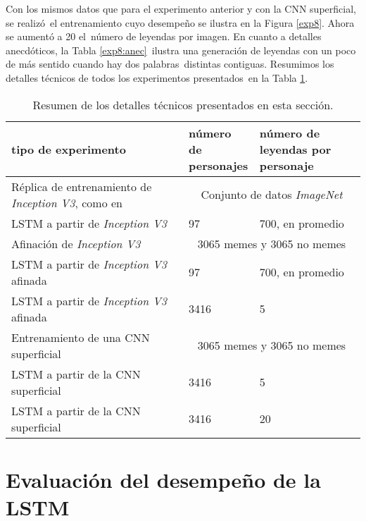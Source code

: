 Con los mismos datos que para el experimento anterior y con la CNN superficial, se realizó\
el entrenamiento cuyo desempeño se ilustra en la Figura \ref{exp8}. Ahora se aumentó a 20 el\
número de leyendas por imagen. En cuanto a detalles anecdóticos, la Tabla \ref{exp8:anec}\
ilustra una generación de leyendas con un poco de más sentido cuando hay dos palabras\
distintas contiguas. Resumimos los detalles técnicos de todos los experimentos presentados\
en la Tabla \ref{exp-details}.

\begin{table}[H]
  \begin{tabular}{|p{0.5\linewidth}|p{0.2\linewidth}|p{0.3\linewidth}|}
    \hline
    \textbf{tipo de experimento} & \textbf{número de personajes} & \textbf{número de leyendas por personaje}\\
    \hline \hline
    Réplica de entrenamiento de \emph{Inception V3}, como en \cite{DBLP:journals/corr/VinyalsTBE16} & \multicolumn{2}{|c|}{Conjunto de datos \emph{ImageNet}} \\
    \hline
    LSTM a partir de \emph{Inception V3} & 97 & 700, en promedio \\
    \hline
    Afinación de \emph{Inception V3} & \multicolumn{2}{|c|}{3065 memes y 3065 no memes} \\
    \hline
    LSTM a partir de \emph{Inception V3} afinada & 97 & 700, en promedio \\
    \hline
    LSTM a partir de \emph{Inception V3} afinada & 3416 & 5 \\
    \hline
    Entrenamiento de una CNN superficial & \multicolumn{2}{|c|}{3065 memes y 3065 no memes} \\
    \hline
    LSTM a partir de la CNN superficial & 3416 & 5 \\
    \hline
    LSTM a partir de la CNN superficial & 3416 & 20 \\
    \hline
  \end{tabular}
  \caption{
    Resumen de los detalles técnicos presentados en esta sección.
  }
  \label{exp-details}
\end{table}

\section{Evaluación del desempeño de la LSTM} \label{sec:metrics}

